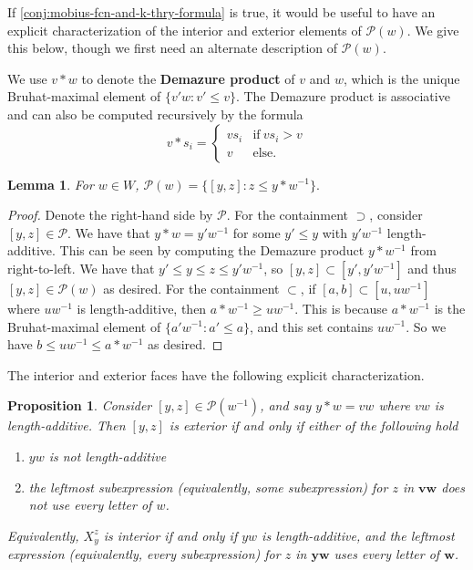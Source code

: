 \documentclass[10pt,a4paper]{amsart}
\newtheorem{lemma}[Thm]{Lemma}
\newtheorem{proposition}[Thm]{Proposition}
\newcommand\defn[1]{{\bf #1}}
\def\bw{\mathbf{w}}
\def\bv{\mathbf{v}}
\def\calP{\mathcal{P}}
\begin{document}
If \cref{conj:mobius-fcn-and-k-thry-formula} is true, it would be useful to have an explicit characterization of the interior and exterior elements of $\calP(w)$. We give this below, though we first need an alternate description of $\calP(w)$.
 
 We use $v*w$ to denote the \defn{Demazure product} of $v$ and $w$, which is the unique Bruhat-maximal element of $\{v'w: v' \leq v\}$. The Demazure product is associative and can also be computed recursively by the formula
 \[v * s_i = \begin{cases}
 		v s_i & \text{if}~ vs_i > v\\
 		v & \text{else}.
 	\end{cases}\]
 

\begin{lemma}\label{lem:interval-poset-Demazure-prod}
For $w \in W$, $\calP(w)= \{[y,z]: z \leq y * w^{-1}\}.$
\end{lemma}
\begin{proof} Denote the right-hand side by $\calP$.
For the containment $\supset$, consider $[y,z] \in \calP$. We have that $y * w= y' w^{-1}$ for some $y' \leq y$ with $y' w^{-1}$ length-additive. This can be seen by computing the Demazure product $y*w^{-1}$ from right-to-left. We have that $y' \leq y \leq z \leq y'w^{-1}$, so $[y,z] \subset [y', y'w^{-1}]$ and thus $[y,z] \in \calP(w)$ as desired. For the containment $\subset$, if $[a,b] \subset [u, uw^{-1}]$ where $uw^{-1}$ is length-additive, then $a*w^{-1} \geq uw^{-1}$. This is because $a*w^{-1}$ is the Bruhat-maximal element of $\{a'w^{-1}: a' \leq a\}$, and this set contains $uw^{-1}$. So we have $b \leq uw^{-1} \leq a*w^{-1}$ as desired.
\end{proof}

The interior and exterior faces have the following explicit characterization.

\begin{proposition}
	Consider $[y,z] \in \calP(w^{-1})$, and say $y * w = vw$ where $vw$ is length-additive. Then $[y,z]$ is exterior if and only if either of the following hold
	\begin{enumerate}
		\item $yw$ is not length-additive 
		\item the leftmost subexpression (equivalently, some subexpression) for $z$ in $\bv \bw$ does not use every letter of $w$.
	\end{enumerate}
	
	Equivalently, $X_y^z$ is interior if and only if $yw$ is length-additive, and the leftmost expression (equivalently, every subexpression) for $z$ in $\mathbf{y} \bw$ uses every letter of $\bw$.
\end{proposition}
\end{document}
